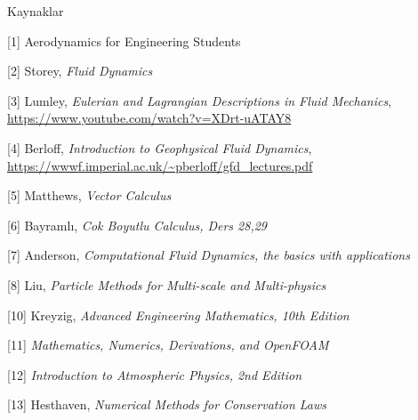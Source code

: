 \documentclass[12pt,fleqn]{article}\usepackage{../../common}
\begin{document}
Kaynaklar

[1] Aerodynamics for Engineering Students

[2] Storey, {\em Fluid Dynamics}

[3] Lumley, {\em Eulerian and Lagrangian Descriptions in Fluid Mechanics},
    \url{https://www.youtube.com/watch?v=XDrt-uATAY8}

[4] Berloff, {\em Introduction to Geophysical Fluid Dynamics},
    \url{https://wwwf.imperial.ac.uk/~pberloff/gfd_lectures.pdf}

[5] Matthews, {\em Vector Calculus}

[6] Bayramlı, {\em Cok Boyutlu Calculus, Ders 28,29}
    
[7] Anderson, {\em Computational Fluid Dynamics, the basics with applications}

[8] Liu, {\em Particle Methods for Multi-scale and Multi-physics}

[10] Kreyzig, {\em Advanced Engineering Mathematics, 10th Edition}

[11] {\em Mathematics, Numerics, Derivations, and OpenFOAM}

[12] {\em Introduction to Atmospheric Physics, 2nd Edition}

[13] Hesthaven, {\em Numerical Methods for Conservation Laws}
\end{document}
